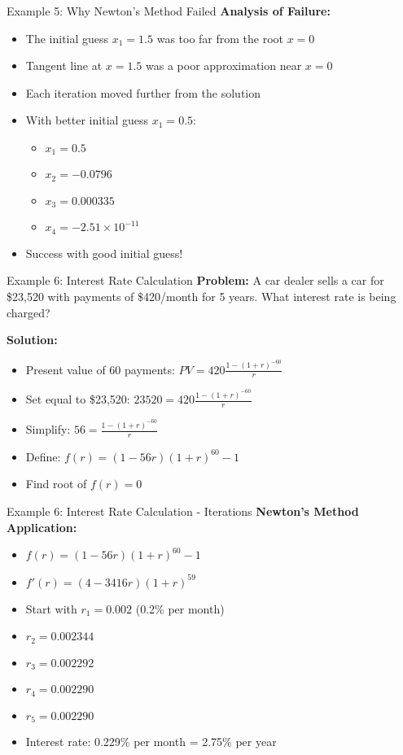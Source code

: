 \documentclass[aspectratio=169]{beamer}
\begin{document}
\begin{frame}{Example 5: Why Newton's Method Failed}
\textbf{Analysis of Failure:}
\begin{itemize}
    \item The initial guess $x_1 = 1.5$ was too far from the root $x = 0$
    \item Tangent line at $x = 1.5$ was a poor approximation near $x = 0$
    \item Each iteration moved further from the solution
    \item With better initial guess $x_1 = 0.5$:
    \begin{itemize}
        \item $x_1 = 0.5$
        \item $x_2 = -0.0796$
        \item $x_3 = 0.000335$
        \item $x_4 = -2.51 \times 10^{-11}$
    \end{itemize}
    \item Success with good initial guess!
\end{itemize}
\end{frame}

\begin{frame}{Example 6: Interest Rate Calculation}
\textbf{Problem:} A car dealer sells a car for \$23,520 with payments of \$420/month for 5 years. What interest rate is being charged?

\textbf{Solution:}
\begin{itemize}
    \item Present value of 60 payments: $PV = 420\frac{1 - (1 + r)^{-60}}{r}$
    \item Set equal to \$23,520: $23520 = 420\frac{1 - (1 + r)^{-60}}{r}$
    \item Simplify: $56 = \frac{1 - (1 + r)^{-60}}{r}$
    \item Define: $f(r) = (1 - 56r)(1 + r)^{60} - 1$
    \item Find root of $f(r) = 0$
\end{itemize}
\end{frame}

\begin{frame}{Example 6: Interest Rate Calculation - Iterations}
\textbf{Newton's Method Application:}
\begin{itemize}
    \item $f(r) = (1 - 56r)(1 + r)^{60} - 1$
    \item $f'(r) = (4 - 3416r)(1 + r)^{59}$
    \item Start with $r_1 = 0.002$ (0.2\% per month)
    \item $r_2 = 0.002344$
    \item $r_3 = 0.002292$
    \item $r_4 = 0.002290$
    \item $r_5 = 0.002290$
    \item Interest rate: 0.229\% per month = 2.75\% per year
\end{itemize}
\end{frame}
\end{document}
